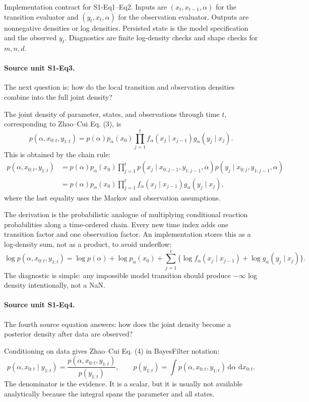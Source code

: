 \documentclass[11pt]{article}
\newcommand{\dd}{\,\mathrm d}
\begin{document}
Implementation contract for S1-Eq1--Eq2.  Inputs are \((x_t,x_{t-1},\alpha)\)
for the transition evaluator and \((y_t,x_t,\alpha)\) for the observation
evaluator.  Outputs are nonnegative densities or log densities.  Persisted
state is the model specification and the observed \(y_t\).  Diagnostics are
finite log-density checks and shape checks for \(m,n,d\).

\paragraph{Source unit S1-Eq3.}
The next question is: how do the local transition and observation densities
combine into the full joint density?

The joint density of parameter, states, and observations through time \(t\),
corresponding to Zhao--Cui Eq. (3), is
\[
    p(\alpha,x_{0:t},y_{1:t})
    =
    p(\alpha)p_\alpha(x_0)
    \prod_{j=1}^{t}
    f_\alpha(x_j\mid x_{j-1})g_\alpha(y_j\mid x_j).
    \tag{BF-3}
\]
This is obtained by the chain rule:
\[
\begin{aligned}
 p(\alpha,x_{0:t},y_{1:t})
 &=
 p(\alpha)p_\alpha(x_0)
 \prod_{j=1}^t
 p(x_j\mid x_{0:j-1},y_{1:j-1},\alpha)
 p(y_j\mid x_{0:j},y_{1:j-1},\alpha)\\
 &=
 p(\alpha)p_\alpha(x_0)
 \prod_{j=1}^t
 f_\alpha(x_j\mid x_{j-1})g_\alpha(y_j\mid x_j),
\end{aligned}
\]
where the last equality uses the Markov and observation assumptions.

The derivation is the probabilistic analogue of multiplying conditional
reaction probabilities along a time-ordered chain.  Every new time index adds
one transition factor and one observation factor.  An implementation stores
this as a log-density sum, not as a product, to avoid underflow:
\[
    \log p(\alpha,x_{0:t},y_{1:t})
    =
    \log p(\alpha)+\log p_\alpha(x_0)
    +
    \sum_{j=1}^t
    \{\log f_\alpha(x_j\mid x_{j-1})+\log g_\alpha(y_j\mid x_j)\}.
    \tag{BF-3a}
\]
The diagnostic is simple: any impossible model transition should produce
\(-\infty\) log density intentionally, not a NaN.

\paragraph{Source unit S1-Eq4.}
The fourth source equation answers: how does the joint density become a
posterior density after data are observed?

Conditioning on data gives Zhao--Cui Eq. (4) in BayesFilter notation:
\[
    p(\alpha,x_{0:t}\mid y_{1:t})
    =
    \frac{p(\alpha,x_{0:t},y_{1:t})}
    {p(y_{1:t})},
    \qquad
    p(y_{1:t})
    =
    \int p(\alpha,x_{0:t},y_{1:t})
    \dd\alpha\,\dd x_{0:t}.
    \tag{BF-4}
\]
The denominator is the evidence.  It is a scalar, but it is usually not
available analytically because the integral spans the parameter and all states.
\end{document}
